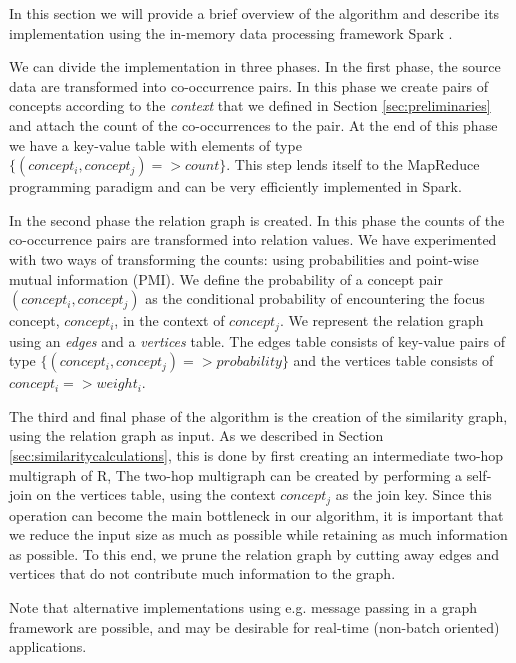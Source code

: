 In this section we will provide a brief overview of the algorithm
and describe its implementation using the in-memory data processing
framework Spark \cite{Zaharia-2012}.


We can divide the implementation in three phases. In the first phase,
the source data are transformed into co-occurrence pairs. In this phase
we create pairs of concepts according to the \textit{context} that we defined
in Section \ref{sec:preliminaries}
and attach the count of the co-occurrences to the pair.
At the end of this phase we have a key-value table with elements of type
$\{(concept_i, concept_j) => count\}$. %
This step lends
itself to the MapReduce programming paradigm and can be very efficiently
implemented in Spark.

In the second phase the relation graph is created. In this phase the counts
of the co-occurrence pairs are transformed into relation values. We have experimented
with two ways of transforming the counts: using  probabilities and point-wise
mutual information (PMI). %
We define the probability of a concept pair $(concept_i, concept_j)$ as the conditional
probability of encountering the focus concept, $concept_i$, in the context
of $concept_j$. %
We represent the relation graph using an \textit{edges} and a \textit{vertices} table. %
The edges table consists of key-value pairs of type
$\{(concept_i, concept_j) => probability\}$ and the vertices table consists of
${concept_i => weight_i}$. %

The third and final phase of the algorithm is the creation of the similarity graph,
using the relation graph as input. As we described in Section \ref{sec:similaritycalculations},
this is done by first creating an intermediate two-hop multigraph of R, %
The two-hop multigraph can be  created by performing a self-join on the vertices table,
using the context $concept_j$ as the join key.
Since this operation can become the main bottleneck in our algorithm, it is important that we reduce the input size
as much as possible while retaining as much information as possible. To this end, we prune the relation graph
by cutting away edges and vertices that do not contribute much information to the graph. %

Note that alternative implementations using e.g. message passing in a graph framework are possible, and may be desirable for real-time (non-batch oriented) applications.